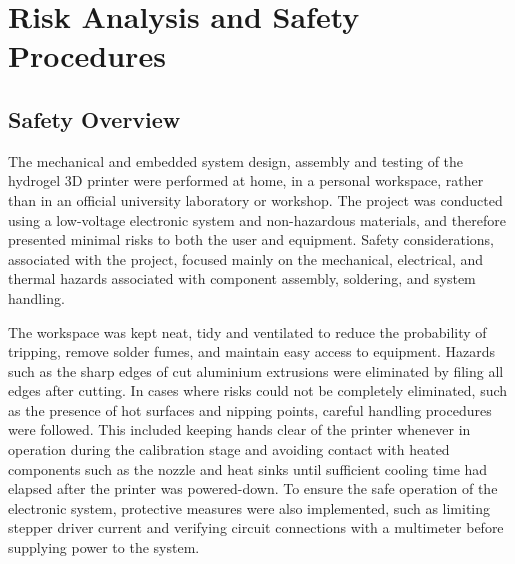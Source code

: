 \chapter{Risk Analysis and Safety Procedures}
\section*{Safety Overview}
The mechanical and embedded system design, assembly and testing of the hydrogel 3D printer were performed at home, in a personal workspace, rather than in an official university laboratory or workshop. The project was conducted using a low-voltage electronic system and non-hazardous materials, and therefore presented minimal risks to both the user and equipment. Safety considerations, associated with the project, focused mainly on the mechanical, electrical, and thermal hazards associated with component assembly, soldering, and system handling.

The workspace was kept neat, tidy and ventilated to reduce the probability of tripping, remove solder fumes, and maintain easy access to equipment. Hazards such as the sharp edges of cut aluminium extrusions were eliminated by filing all edges after cutting. In cases where risks could not be completely eliminated, such as the presence of hot surfaces and nipping points, careful handling procedures were followed. This included keeping hands clear of the printer whenever in operation during the calibration stage and avoiding contact with heated components such as the nozzle and heat sinks until sufficient cooling time had elapsed after the printer was powered-down. To ensure the safe operation of the electronic system, protective measures were also implemented, such as limiting stepper driver current and verifying circuit connections with a multimeter before supplying power to the system.
